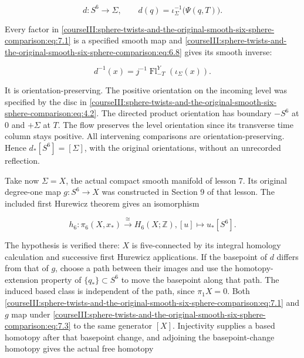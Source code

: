 \begin{equation}
d:S^6\longrightarrow\Sigma,\qquad
              d(q)=\iota_\Sigma^{-1}\bigl(\Psi(q,T)\bigr).
 \label{courseIII:sphere-twists-and-the-original-smooth-six-sphere-comparison:eq:7.1}
\end{equation}

Every factor in \eqref{courseIII:sphere-twists-and-the-original-smooth-six-sphere-comparison:eq:7.1} is a specified smooth map and \eqref{courseIII:sphere-twists-and-the-original-smooth-six-sphere-comparison:eq:6.8} gives its smooth inverse:

\begin{equation}
d^{-1}(x)=j^{-1}\operatorname{Fl}^{Y}_{-T}(\iota_\Sigma(x)).
 \label{courseIII:sphere-twists-and-the-original-smooth-six-sphere-comparison:eq:7.2}
\end{equation}

It is orientation-preserving. The positive orientation on the incoming level was specified by the disc in \eqref{courseIII:sphere-twists-and-the-original-smooth-six-sphere-comparison:eq:4.2}. The directed product orientation has boundary \(-S^6\) at \(0\) and \(+\Sigma\) at \(T\). The flow preserves the level orientation since its transverse time column stays positive. All intervening comparisons are orientation-preserving. Hence \(d_*[S^6]=[\Sigma]\), with the original orientations, without an unrecorded reflection.

Take now \(\Sigma=X\), the actual compact smooth manifold of lesson 7. Its original degree-one map \(g:S^6\to X\) was constructed in Section 9 of that lesson. The included first Hurewicz theorem gives an isomorphism

\begin{equation}
h_6:\pi_6(X,x_*)\xrightarrow{\cong}H_6(X;\mathbb Z),
                         [u]\longmapsto u_*[S^6].
 \label{courseIII:sphere-twists-and-the-original-smooth-six-sphere-comparison:eq:7.3}
\end{equation}

The hypothesis is verified there: \(X\) is five-connected by its integral homology calculation and successive first Hurewicz applications. If the basepoint of \(d\) differs from that of \(g\), choose a path between their images and use the homotopy-extension property of \(\{q_*\}\subset S^6\) to move the basepoint along that path. The induced based class is independent of the path, since \(\pi_1X=0\). Both \eqref{courseIII:sphere-twists-and-the-original-smooth-six-sphere-comparison:eq:7.1} and \(g\) map under \eqref{courseIII:sphere-twists-and-the-original-smooth-six-sphere-comparison:eq:7.3} to the same generator \([X]\). Injectivity supplies a based homotopy after that basepoint change, and adjoining the basepoint-change homotopy gives the actual free homotopy

